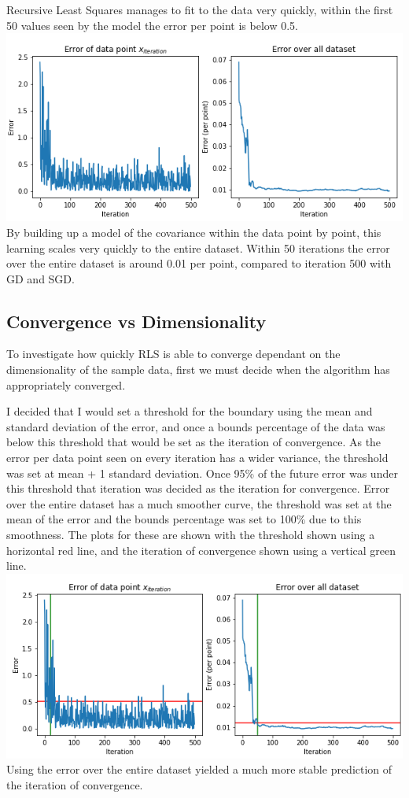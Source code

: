 Recursive Least Squares manages to fit to the data very quickly, within the first 50 values seen by the model the error per point is below 0.5.
\includegraphics[width=\linewidth]{figs/RLS Error of points.png}
By building up a model of the covariance within the data point by point, this learning scales very quickly to the entire dataset. Within 50 iterations the error over the entire dataset is around 0.01 per point, compared to iteration 500 with GD and SGD.
\subsection{Convergence vs Dimensionality}
To investigate how quickly RLS is able to converge dependant on the dimensionality of the sample data, first we must decide when the algorithm has appropriately converged.

I decided that I would set a threshold for the boundary using the mean and standard deviation of the error, and once a bounds percentage of the data was below this threshold that would be set as the iteration of convergence.
As the error per data point seen on every iteration has a wider variance, the threshold was set at mean + 1 standard deviation. Once 95\% of the future error was under this threshold that iteration was decided as the iteration for convergence.
Error over the entire dataset has a much smoother curve, the threshold was set at the mean of the error and the bounds percentage was set to 100\% due to this smoothness. 
The plots for these are shown with the threshold shown using a horizontal red line, and the iteration of convergence shown using a vertical green line. 
\includegraphics[width=\linewidth]{figs/RLS Error W Lines.png}
Using the error over the entire dataset yielded a much more stable prediction of the iteration of convergence.

